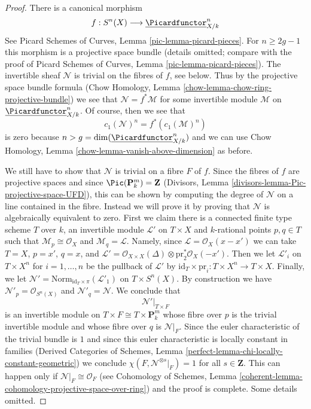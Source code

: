 \begin{proof}
\medskip\noindent
There is a canonical morphism
$$
f : S^n(X) \longrightarrow \underline{\Picardfunctor}^n_{X/k}
$$
See Picard Schemes of Curves, Lemma \ref{pic-lemma-picard-pieces}.
For $n \geq 2g - 1$ this morphism is a projective space bundle
(details omitted; compare with the
proof of Picard Schemes of Curves, Lemma \ref{pic-lemma-picard-pieces}).
The invertible sheaf $\mathcal{N}$ is trivial on the
fibres of $f$, see below. Thus by the projective space bundle formula
(Chow Homology, Lemma \ref{chow-lemma-chow-ring-projective-bundle})
we see that $\mathcal{N} = f^*\mathcal{M}$ for some invertible
module $\mathcal{M}$ on $\underline{\Picardfunctor}^n_{X/k}$.
Of course, then we see that
$$
c_1(\mathcal{N})^n = f^*(c_1(\mathcal{M})^n)
$$
is zero because $n > g = \dim(\underline{\Picardfunctor}^n_{X/k})$
and we can use Chow Homology, Lemma \ref{chow-lemma-vanish-above-dimension}
as before.

\medskip\noindent
We still have to show that $\mathcal{N}$ is trivial on a fibre $F$
of $f$. Since the fibres of $f$ are projective spaces and since
$\Pic(\mathbf{P}^m_k) = \mathbf{Z}$
(Divisors, Lemma \ref{divisors-lemma-Pic-projective-space-UFD}),
this can be shown by computing the degree of $\mathcal{N}$
on a line contained in the fibre. Instead we will prove it by
proving that $\mathcal{N}$ is algebraically
equivalent to zero. First we claim there is a connected finite type scheme $T$
over $k$, an invertible module $\mathcal{L}'$ on $T \times X$ and
$k$-rational points $p, q \in T$ such that
$\mathcal{M}_p \cong \mathcal{O}_X$ and $\mathcal{M}_q = \mathcal{L}$.
Namely, since $\mathcal{L} = \mathcal{O}_X(x - x')$ we can take
$T = X$, $p = x'$, $q = x$, and
$\mathcal{L}' = \mathcal{O}_{X \times X}(\Delta)
\otimes \text{pr}_2^*\mathcal{O}_X(-x')$.
Then we let $\mathcal{L}'_i$ on
$T \times X^n$ for $i = 1, \ldots, n$
be the pullback of $\mathcal{L}'$ by
$\text{id}_T \times \text{pr}_i : T \times X^n \to T \times X$.
Finally, we let
$\mathcal{N}' = \text{Norm}_{\text{id}_T \times \pi}(\mathcal{L}'_1)$
on $T \times S^n(X)$.
By construction we have $\mathcal{N}'_p = \mathcal{O}_{S^n(X)}$
and $\mathcal{N}'_q = \mathcal{N}$.
We conclude that
$$
\mathcal{N}'|_{T \times F}
$$
is an invertible module on $T \times F \cong T \times \mathbf{P}^m_k$
whose fibre over $p$ is the trivial invertible module and whose fibre
over $q$ is $\mathcal{N}|_F$. Since the euler characteristic
of the trivial bundle is $1$ and since this euler characteristic
is locally constant in families (Derived Categories of Schemes,
Lemma \ref{perfect-lemma-chi-locally-constant-geometric})
we conclude $\chi(F, \mathcal{N}^{\otimes s}|_F) = 1$
for all $s \in \mathbf{Z}$. This can happen only if
$\mathcal{N}|_F \cong \mathcal{O}_F$ (see
Cohomology of Schemes, Lemma
\ref{coherent-lemma-cohomology-projective-space-over-ring})
and the proof is complete. Some details omitted.
\end{proof}















